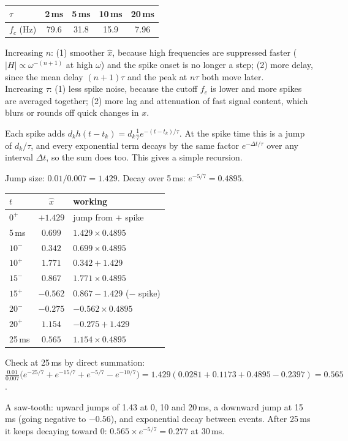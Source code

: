 \documentclass[10pt,letterpaper]{article}
\newcommand{\ans}[1]{\par\vspace{3pt}{\bfseries #1}\quad}
\begin{document}
\begin{center}
\begin{tabular}{lcccc}
\toprule
$\tau$ & 2\,ms & 5\,ms & 10\,ms & 20\,ms \\
\midrule
$f_c$ (Hz) & 79.6 & 31.8 & 15.9 & 7.96 \\
\bottomrule
\end{tabular}
\end{center}
\begin{result}
Increasing $n$: (1) smoother $\hat x$, because high frequencies are suppressed faster ($|H| \propto \omega^{-(n+1)}$ at high $\omega$) and the spike onset is no longer a step; (2) more delay, since the mean delay $(n+1)\tau$ and the peak at $n\tau$ both move later.\\
Increasing $\tau$: (1) less spike noise, because the cutoff $f_c$ is lower and more spikes are averaged together; (2) more lag and attenuation of fast signal content, which blurs or rounds off quick changes in $x$.
\end{result}

\ans{5d.}
Each spike adds $d_k h(t - t_k) = d_k\frac{1}{\tau}e^{-(t - t_k)/\tau}$. At the spike time this is a jump of $d_k/\tau$, and every exponential term decays by the same factor $e^{-\Delta t/\tau}$ over any interval $\Delta t$, so the sum does too. This gives a simple recursion.

Jump size: $0.01/0.007 = 1.429$. Decay over 5\,ms: $e^{-5/7} = 0.4895$.
\begin{center}
\begin{tabular}{lcl}
\toprule
$t$ & $\hat x$ & working \\
\midrule
$0^+$ & $+1.429$ & jump from $+$ spike \\
5\,ms & $0.699$ & $1.429 \times 0.4895$ \\
$10^-$ & $0.342$ & $0.699 \times 0.4895$ \\
$10^+$ & $1.771$ & $0.342 + 1.429$ \\
$15^-$ & $0.867$ & $1.771 \times 0.4895$ \\
$15^+$ & $-0.562$ & $0.867 - 1.429$ ($-$ spike) \\
$20^-$ & $-0.275$ & $-0.562 \times 0.4895$ \\
$20^+$ & $1.154$ & $-0.275 + 1.429$ \\
25\,ms & $0.565$ & $1.154 \times 0.4895$ \\
\bottomrule
\end{tabular}
\end{center}
Check at 25\,ms by direct summation: $\frac{0.01}{0.007}\big(e^{-25/7} + e^{-15/7} + e^{-5/7} - e^{-10/7}\big) = 1.429(0.0281 + 0.1173 + 0.4895 - 0.2397) = 0.565$. \checkmark
\begin{sketch}
A saw-tooth: upward jumps of 1.43 at 0, 10 and 20\,ms, a downward jump at 15\,ms (going negative to $-0.56$), and exponential decay between events. After 25\,ms it keeps decaying toward 0: $0.565 \times e^{-5/7} = 0.277$ at 30\,ms.
\end{sketch}
\end{document}
